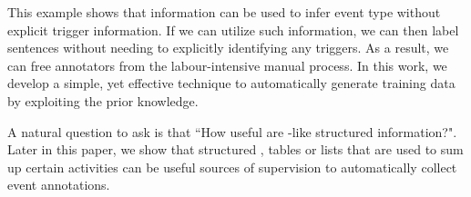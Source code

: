 This example shows that \CVT information can be used to infer event type without explicit trigger information. If we can utilize such \CVT
information, we can then label sentences without needing to explicitly identifying any triggers. As a result, we can free annotators from
the labour-intensive manual process. In this work, we develop a simple, yet effective technique to automatically generate training data by
exploiting the prior \CVT knowledge.

A natural question to ask is that ``How useful are \CVT-like structured information?". Later in this paper, we show that structured
\KBs, tables or lists that are used to sum up certain activities can be useful sources of supervision to automatically collect event
annotations. %

%


